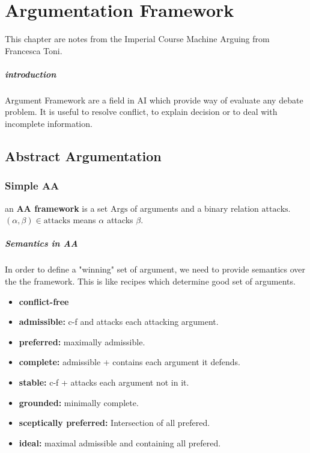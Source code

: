 \chapter{Argumentation Framework} %
\label{cha:argumentation_framework}

This chapter are notes from the Imperial Course Machine Arguing from Francesca Toni. 

\paragraph{introduction} %
\label{par:introduction}

	Argument Framework are a field in AI which provide way of evaluate any debate problem. It is useful to resolve conflict, to explain decision or to deal with incomplete information. 
\section{Abstract Argumentation}

	\subsection{Simple AA}

		\begin{definition}
		 		an  \textbf{AA framework} is a set $\mathrm{Args}$ of arguments and a binary relation $\mathrm{attacks}$. $(\alpha, \beta)\in \mathrm{attacks}$ means $\alpha$ attacks $\beta$.
		\end{definition} 

		\paragraph{Semantics in AA} 
			In order to define a "winning" set of argument, we need to provide semantics over the the framework. This is like recipes which determine good set of arguments. 

		\begin{definition}
			\begin{itemize}
				\item \textbf{conflict-free}
				\item \textbf{admissible:} c-f and attacks each attacking argument.
				\item \textbf{preferred:} maximally admissible.
				\item \textbf{complete:} admissible + contains each argument it defends.
				\item \textbf{stable:} c-f + attacks each argument not in it.
				\item \textbf{grounded:} minimally complete.
				\item \textbf{sceptically preferred:} Intersection of all prefered.
				\item \textbf{ideal:} maximal admissible and containing all prefered.
			\end{itemize}
		\end{definition}

